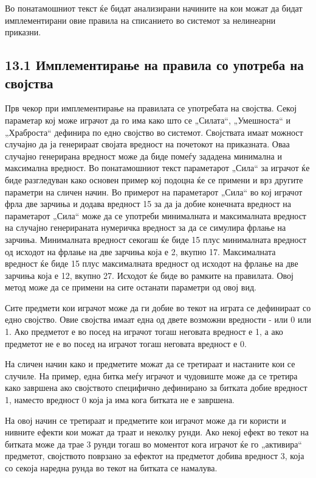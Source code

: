 Во понатамошниот текст ќе бидат анализирани начините на кои можат да бидат имплементирани овие правила на списанието во системот за нелинеарни приказни.

\subsection{13.1 Имплементирање на правила со употреба на својства}

Прв чекор при имплементирање на правилата се употребата на својства. Секој параметар кој може играчот да го има како што се „Силата“, „Умешноста“ и „Храброста“ дефинира по едно својство во системот. Својствата имаат можност случајно да ја генерираат својата вредност на почетокот на приказната. Оваа случајно генерирана вредност може да биде помеѓу зададена минимална и максимална вредност. Во понатамошниот текст параметарот „Сила“ за играчот ќе биде разгледуван како основен пример кој подоцна ќе се примени и врз другите параметри на сличен начин. Во примерот на параметарот „Сила“ во кој играчот фрла две зарчиња и додава вредност 15 за да ја добие конечната вредност на параметарот „Сила“ може да се употреби минималната и максималната вредност на случајно генерираната нумеричка вредност за да се симулира фрлање на зарчиња. Минималната вредност секогаш ќе биде 15 плус минималната вредност од исходот на фрлање на две зарчиња која е 2, вкупно 17. Максималната вредност ќе биде 15 плус максималната вредност од исходот на фрлање на две зарчиња која е 12, вкупно 27. Исходот ќе биде во рамките на правилата. Овој метод може да се примени на сите останати параметри од овој вид.

Сите предмети кои играчот може да ги добие во текот на играта се дефинираат со едно својство. Овие својства имаат една од двете возможни вредности - или 0 или 1. Ако предметот е во посед на играчот тогаш неговата вредност е 1, а ако предметот не е во посед на играчот тогаш неговата вредност е 0.

На сличен начин како и предметите можат да се третираат и настаните кои се случиле. На пример, една битка меѓу играчот и чудовиште може да се третира како завршена ако својството специфично дефинирано за битката добие вредност 1, наместо вредност 0 која ја има кога битката не е завршена.

На овој начин се третираат и предметите кои играчот може да ги користи и нивните ефекти кои можат да траат и неколку рунди. Ако некој ефект во текот на битката може да трае 3 рунди тогаш во моментот кога играчот ќе го „активира“ предметот, својството поврзано за ефектот на предметот добива вредност 3, која со секоја наредна рунда во текот на битката се намалува.


